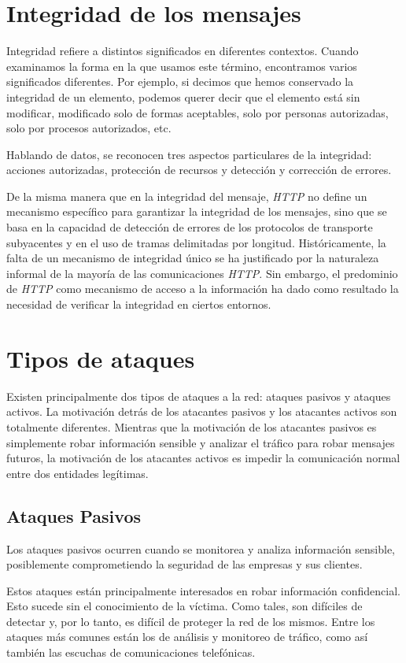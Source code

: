 \section{Integridad de los mensajes}
Integridad refiere a distintos significados en diferentes contextos. Cuando examinamos 
la forma en la que usamos este término, encontramos varios significados diferentes. 
Por ejemplo, si decimos que hemos conservado la integridad de un elemento, podemos 
querer decir que el elemento está sin modificar, modificado solo de formas aceptables, 
solo por personas autorizadas, solo por procesos autorizados, 
etc.

Hablando de datos, se reconocen tres aspectos particulares de la integridad: 
acciones autorizadas, protección de recursos y detección y corrección de errores. 


De la misma manera que en la integridad del mensaje,
\emph{HTTP} no define un mecanismo específico para garantizar la integridad de los 
mensajes, sino que se basa en la capacidad de detección de errores de los 
protocolos de transporte subyacentes y en el uso de tramas delimitadas por 
longitud. Históricamente, la falta de un mecanismo de integridad único se 
ha justificado por la naturaleza informal de la mayoría de las comunicaciones 
\emph{HTTP}. Sin embargo, el predominio de \emph{HTTP} como mecanismo de acceso a la 
información ha dado como resultado la necesidad de verificar la integridad
en ciertos entornos.


\section{Tipos de ataques}
Existen principalmente dos tipos de ataques a la red: ataques pasivos y 
ataques activos. La motivación detrás de los atacantes pasivos y los atacantes 
activos son totalmente diferentes. Mientras que la motivación de los atacantes 
pasivos es simplemente robar información sensible y analizar el tráfico para 
robar mensajes futuros, la motivación de los atacantes activos es impedir la 
comunicación normal entre dos entidades legítimas.

\subsection{Ataques Pasivos}
Los ataques pasivos ocurren cuando se monitorea y analiza 
información sensible, posiblemente comprometiendo la seguridad de las 
empresas y sus clientes. 

Estos ataques están principalmente interesados en robar información 
confidencial. Esto sucede sin el conocimiento de la víctima. Como tales, 
son difíciles de detectar y, por lo tanto, es difícil de
proteger la red de los mismos. Entre los ataques más comunes están los 
 de análisis y monitoreo de tráfico, como así también las 
escuchas de comunicaciones telefónicas.

